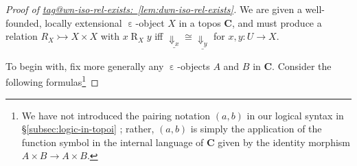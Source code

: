 \documentclass{amsart}
\makeatletter
\newcommand\bC{\mathbf{C}}
\newcommand\Dwn{{\Downarrow}}
\newcommand\ein{\mathrel{\varepsilon}}
\newcommand\Rrel{\mathrel{R}}
\newcommand\tto{\rightarrowtail}
\newcommand\und[1]{\underline{#1}}
\newcommand\tagword[1]{\csname tag@#1\endcsname}
\def\label@tag#1:#2\@nil{#1}
\newcommand\labeltag[1]{\label@tag#1:\@nil}
\newcommand\jref[1]{%
  \texorpdfstring%
    {\hyperref[#1]{\tagword{\labeltag{#1}}~\ref*{#1}}}%
    {\tagword{\labeltag{#1}}~\ref*{#1}}%
}
\newcommand\prerefpost[3]{%
  \texorpdfstring%
    {\hyperref[#2]{#1\ref*{#2}#3}}%
    {#1\ref*{#2}#3}%
}
\newcommand\sref[1]{\prerefpost{\S}{#1}{}}
\theoremstyle{definition}
\theoremstyle{remark}
\theoremstyle{plainwithref}
\makeatother
\begin{document}
\begin{proof}[Proof of \jref{lem:dwn-iso-rel-exists}] \label{proof:dwn-iso-rel-exists}
  We are given a well-founded, locally extensional \( \ein \)-object \( X \) in a topos \( \bC \), and must produce a relation \( R_X \tto X \times X \) with \( x \Rrel_X y \) iff \( \und{\Dwn_x} \cong \und{\Dwn_y} \) for \( x,y \colon U \to X \).

  To begin with, fix more generally any \( \ein \)-objects \( A \) and \( B \) in \( \bC \).
  Consider the following formulas\footnote{%
      We have not introduced the pairing notation \( (a,b) \) in our logical syntax in \sref{subsec:logic-in-topoi}; rather, \( (a, b) \) is simply the application of the function symbol in the internal language of \( \bC \) given by the identity morphism \( A \times B \to A \times B \). %

}
\end{proof}
\end{document}
